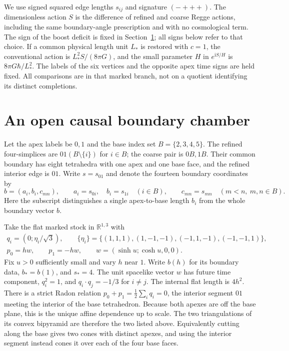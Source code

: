 \documentclass[11pt]{article}
\newcommand{\RR}{\mathbb R}
\newcommand{\I}{\mathrm i}
\begin{document}
We use signed squared edge lengths \(s_{ij}\) and signature \((-+++)\). The dimensionless action \(S\) is the difference of refined and coarse Regge actions, including the same boundary-angle prescription and with no cosmological term. The sign of the boost deficit is fixed in Section~\ref{sec:chamber}; all signs below refer to that choice. If a common physical length unit \(L_*\) is restored with \(c=1\), the conventional action is \(L_*^2S/(8\pi G)\), and the small parameter \(H\) in \(e^{\I S/H}\) is \(8\pi G\hbar/L_*^2\). The labels of the six vertices and the opposite apex time signs are held fixed. All comparisons are in that marked branch, not on a quotient identifying its distinct completions.

\section{An open causal boundary chamber}\label{sec:chamber}

Let the apex labels be \(0,1\) and the base index set \(B=\{2,3,4,5\}\). The refined four-simplices are \(01(B\setminus\{i\})\) for \(i\in B\); the coarse pair is \(0B,1B\). Their common boundary has eight tetrahedra with one apex and one base face, and the refined interior edge is \(01\). Write \(s=s_{01}\) and denote the fourteen boundary coordinates by
\[
 b=(a_i,b_i,c_{mn}),\qquad
 a_i=s_{0i},\quad b_i=s_{1i}\quad(i\in B),\qquad
 c_{mn}=s_{mn}\quad(m<n,\ m,n\in B).
\]
Here the subscript distinguishes a single apex-to-base length \(b_i\) from the whole boundary vector \(b\).

Take the flat marked stock in \(\RR^{1,3}\) with
\[
\begin{gathered}
 q_i=(0;\eta_i/\sqrt3),\qquad
 \{\eta_i\}=\{(1,1,1),(1,-1,-1),(-1,1,-1),(-1,-1,1)\},\\
 p_0=h w,\qquad p_1=-h w,\qquad w=(\sinh u;\cosh u,0,0).
\end{gathered}
\]
Fix \(u>0\) sufficiently small and vary \(h\) near \(1\). Write \(b(h)\) for its boundary data, \(b_*=b(1)\), and \(s_*=4\). The unit spacelike vector \(w\) has future time component, \(q_i^2=1\), and \(q_i\cdot q_j=-1/3\) for \(i\ne j\). The internal flat length is \(4h^2\). There is a strict Radon relation \(p_0+p_1=\frac12\sum_i q_i=0\), the interior segment \(01\) meeting the interior of the base tetrahedron. Because both apexes are off the base plane, this is the unique affine dependence up to scale. The two triangulations of its convex bipyramid are therefore the two listed above. Equivalently cutting along the base gives two cones with distinct apexes, and using the interior segment instead cones it over each of the four base faces.
\end{document}
